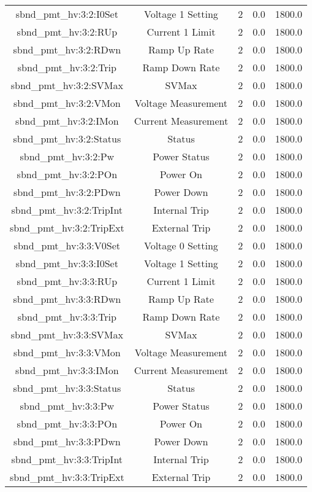\begin{table}[ptb]
\begin{tabular}{c | c c c c}
sbnd_pmt_hv:3:2:I0Set & Voltage 1 Setting & 2 & 0.0 & 1800.0\\ 
sbnd_pmt_hv:3:2:RUp & Current 1 Limit & 2 & 0.0 & 1800.0\\ 
sbnd_pmt_hv:3:2:RDwn & Ramp Up Rate & 2 & 0.0 & 1800.0\\ 
sbnd_pmt_hv:3:2:Trip & Ramp Down Rate & 2 & 0.0 & 1800.0\\ 
sbnd_pmt_hv:3:2:SVMax & SVMax & 2 & 0.0 & 1800.0\\ 
sbnd_pmt_hv:3:2:VMon & Voltage Measurement & 2 & 0.0 & 1800.0\\ 
sbnd_pmt_hv:3:2:IMon & Current Measurement & 2 & 0.0 & 1800.0\\ 
sbnd_pmt_hv:3:2:Status & Status & 2 & 0.0 & 1800.0\\ 
sbnd_pmt_hv:3:2:Pw & Power Status & 2 & 0.0 & 1800.0\\ 
sbnd_pmt_hv:3:2:POn & Power On & 2 & 0.0 & 1800.0\\ 
sbnd_pmt_hv:3:2:PDwn & Power Down & 2 & 0.0 & 1800.0\\ 
sbnd_pmt_hv:3:2:TripInt & Internal Trip & 2 & 0.0 & 1800.0\\ 
sbnd_pmt_hv:3:2:TripExt & External Trip & 2 & 0.0 & 1800.0\\ 
sbnd_pmt_hv:3:3:V0Set & Voltage 0 Setting & 2 & 0.0 & 1800.0\\ 
sbnd_pmt_hv:3:3:I0Set & Voltage 1 Setting & 2 & 0.0 & 1800.0\\ 
sbnd_pmt_hv:3:3:RUp & Current 1 Limit & 2 & 0.0 & 1800.0\\ 
sbnd_pmt_hv:3:3:RDwn & Ramp Up Rate & 2 & 0.0 & 1800.0\\ 
sbnd_pmt_hv:3:3:Trip & Ramp Down Rate & 2 & 0.0 & 1800.0\\ 
sbnd_pmt_hv:3:3:SVMax & SVMax & 2 & 0.0 & 1800.0\\ 
sbnd_pmt_hv:3:3:VMon & Voltage Measurement & 2 & 0.0 & 1800.0\\ 
sbnd_pmt_hv:3:3:IMon & Current Measurement & 2 & 0.0 & 1800.0\\ 
sbnd_pmt_hv:3:3:Status & Status & 2 & 0.0 & 1800.0\\ 
sbnd_pmt_hv:3:3:Pw & Power Status & 2 & 0.0 & 1800.0\\ 
sbnd_pmt_hv:3:3:POn & Power On & 2 & 0.0 & 1800.0\\ 
sbnd_pmt_hv:3:3:PDwn & Power Down & 2 & 0.0 & 1800.0\\ 
sbnd_pmt_hv:3:3:TripInt & Internal Trip & 2 & 0.0 & 1800.0\\ 
sbnd_pmt_hv:3:3:TripExt & External Trip & 2 & 0.0 & 1800.0\\ 

\end{tabular}
\end{table}
